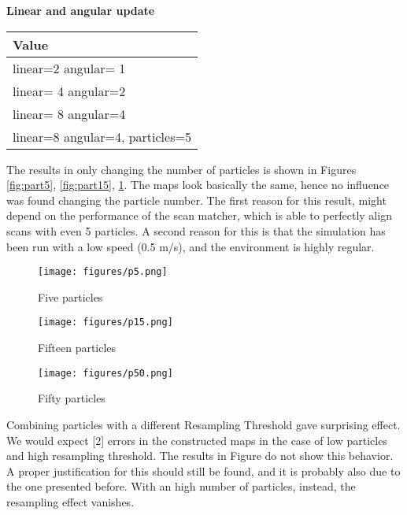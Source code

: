 \documentclass[11pt,a4paper]{article}
\begin{document}
\textbf{Linear and angular update}

\begin{center}
 \label{tab:Table4}
\begin{tabular}{| m{12em} |} 
\hline
\textbf{Value} \\
\hline
linear=2 angular= 1  \\
\hline
linear= 4 angular=2  \\
\hline
linear= 8 angular=4  \\
\hline
linear=8 angular=4, particles=5   \\
\hline
\end{tabular}
\end{center}

The results in only changing the number of particles is shown in Figures \ref{fig:part5}, \ref{fig:part15}, \ref{fig:part50}. The maps look basically the same, hence no influence was found changing the particle number. The first reason for this result, might depend on the performance of the scan matcher, which is able to perfectly align scans with even 5 particles. A second reason for this is that the simulation has been run with a low speed (0.5 m/s), and the environment is highly regular. \\

\begin{figure}[H]
  \texttt{[image: figures/p5.png]}
  \caption{Five particles}\label{fig:part5}
\endminipage\hfill
{}
  \texttt{[image: figures/p15.png]}
  \caption{Fifteen particles}\label{fig:part15}
\endminipage\hfill
{}%
  \texttt{[image: figures/p50.png]}
  \caption{Fifty particles}\label{fig:part50}
\endminipage
\end{figure}

Combining particles with a different Resampling Threshold gave surprising effect. We would expect [2] errors in the constructed maps in the case of low particles and high resampling threshold. The results in Figure do not show this behavior. A proper justification for this should still be found, and it is probably also due to the one presented before. With an high number of particles, instead, the resampling effect vanishes. \\
\end{document}
